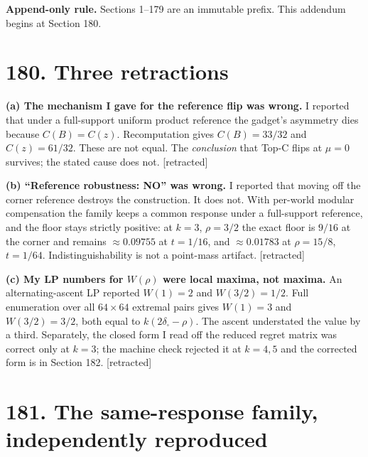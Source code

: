 \documentclass[9pt,twocolumn]{article}
\newcommand{\eclass}[1]{\textsf{[#1]}}
\renewcommand{\_}{\CIGunderscore\allowbreak}
\begin{document}
\sloppy
{}

\textbf{Append-only rule.} Sections 1--179 are an immutable prefix. This addendum begins at Section 180.

\section*{180. Three retractions}

\textbf{(a) The mechanism I gave for the reference flip was wrong.} I reported that under a full-support uniform product reference the gadget's asymmetry dies because $C(B)=C(z)$. Recomputation gives $C(B)=33/32$ and $C(z)=61/32$. These are not equal. The \emph{conclusion} that Top-C flips at $\mu=0$ survives; the stated cause does not. \eclass{retracted}

\textbf{(b) ``Reference robustness: NO'' was wrong.} I reported that moving off the corner reference destroys the construction. It does not. With per-world modular compensation the family keeps a common response under a full-support reference, and the floor stays strictly positive: at $k=3$, $\rho=3/2$ the exact floor is $9/16$ at the corner and remains $\approx 0.09755$ at $t=1/16$, and $\approx 0.01783$ at $\rho=15/8$, $t=1/64$. Indistinguishability is not a point-mass artifact. \eclass{retracted}

\textbf{(c) My LP numbers for $W(\rho)$ were local maxima, not maxima.} An alternating-ascent LP reported $W(1)=2$ and $W(3/2)=1/2$. Full enumeration over all $64\times 64$ extremal pairs gives $W(1)=3$ and $W(3/2)=3/2$, both equal to $k(2\delta_\square-\rho)$. The ascent understated the value by a third. Separately, the closed form I read off the reduced regret matrix was correct only at $k=3$; the machine check rejected it at $k=4,5$ and the corrected form is in Section 182. \eclass{retracted}

\section*{181. The same-response family, independently reproduced}
\end{document}

